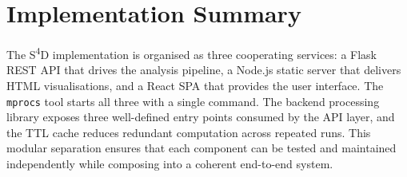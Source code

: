 \section{Implementation Summary}
\label{sec:implementation-summary}

The S\textsuperscript{4}D implementation is organised as three cooperating services: a Flask REST API that drives the analysis pipeline, a Node.js static server that delivers HTML visualisations, and a React SPA that provides the user interface. The \texttt{mprocs} tool starts all three with a single command. The backend processing library exposes three well-defined entry points consumed by the API layer, and the TTL cache reduces redundant computation across repeated runs. This modular separation ensures that each component can be tested and maintained independently while composing into a coherent end-to-end system.
